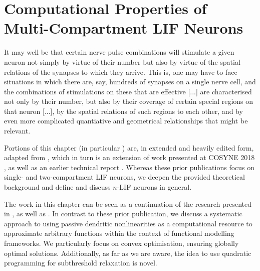 \chapter{Computational Properties of Multi-Compartment LIF Neurons}

\vspace{30pt}

\begin{OpeningQuote}
It may well be that certain nerve pulse combinations will stimulate a given neuron not simply by virtue of their number but also by virtue of the spatial relations of the synapses to which they arrive. This is, one may have to face situations in which there are, say, hundreds of synapses on a single nerve cell, and the combinations of stimulations on these that are effective [...] are characterised not only by their number, but also by their coverage of certain special regions on that neuron [...], by the spatial relations of such regions to each other, and by even more complicated quantiative and geometrical relationships that might be relevant.
\end{OpeningQuote}

\vspace{10pt}

\begin{PriorPublication}
Portions of this chapter (in particular ) are, in extended and heavily edited form, adapted from \citet{stoeckel2021}, which in turn is an extension of work presented at COSYNE 2018 \citep{stockel2018nonlinear}, as well as an earlier technical report \citep{stockel2017point}.
Whereas these prior publications focus on single- and two-compartment LIF neurons, we deepen the provided theoretical background and define and discuss $n$-LIF neurons in general.
\end{PriorPublication}

\begin{Contributions}
The work in this chapter can be seen as a continuation of the research presented in \citet[Chapter~5]{koch1999biophysics}, as well as \citet[Chapter~4]{tripp2009search}.
In contrast to these prior publication, we discuss a systematic approach to using passive dendritic nonlinearities as a computational resource to approximate arbitrary functions within the context of functional modelling frameworks.
We particularly focus on convex optimisation, ensuring globally optimal solutions.
Additionally, as far as we are aware, the idea to use quadratic programming for subthreshold relaxation is novel.
\end{Contributions}

